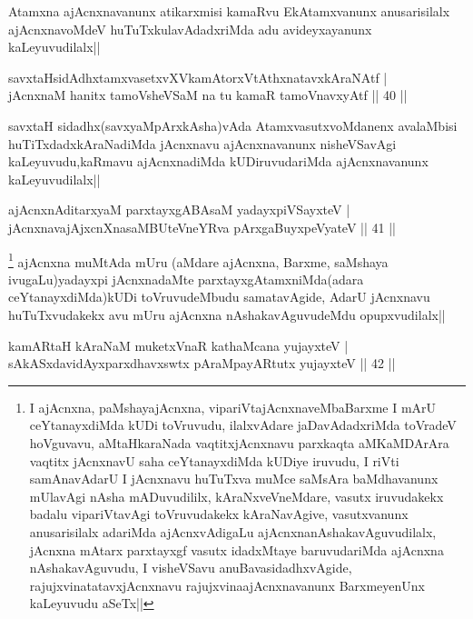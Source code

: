 \begin{artha}
Atamxna ajAcnxnavanunx atikarxmisi kamaRvu EkAtamxvanunx anusarisilalx ajAcnxnavoMdeV huTuTxkulavAdadxriMda adu avideyxayanunx kaLeyuvudilalx||
\end{artha}

\begin{shl}
savxtaHsidAdhxtamxvasetxvXVkamAtorxVtAthxnatavxkAraNAtf |\\
jAcnxnaM hanitx tamoV\s sheVSaM na tu kamaR tamoVnavxyAtf \hfill || 40 ||
\end{shl}

\begin{artha}
savxtaH sidadhx(savxyaMpArxkAsha)vAda AtamxvasutxvoMdanenx avalaMbisi huTiTxdadxkAraNadiMda jAcnxnavu ajAcnxnavanunx nisheVSavAgi kaLeyuvudu,kaRmavu ajAcnxnadiMda kUDiruvudariMda ajAcnxnavanunx kaLeyuvudilalx||
\end{artha}

\begin{shl}
ajAcnxnAditarxyaM parxtayxgABAsaM yadayxpiVSayxteV |\\
jAcnxnavajAjxcnXnasaMBUteVneYRva pArxgaBuyxpeVyateV \hfill || 41 ||
\end{shl}

\begin{artha}
\footnote{I ajAcnxna, paMshayajAcnxna, vipariVtajAcnxnaveMbaBarxme I mArU ceYtanayxdiMda kUDi toVruvudu, ilalxvAdare jaDavAdadxriMda toVradeV hoVguvavu, aMtaHkaraNada vaqtitxjAcnxnavu parxkaqta aMKaMDArAra vaqtitx jAcnxnavU saha ceYtanayxdiMda kUDiye iruvudu, I riVti samAnavAdarU I jAcnxnavu huTuTxva muMce saMsAra baMdhavanunx mUlavAgi nAsha mADuvudililx, kAraNxveVneMdare, vasutx iruvudakekx badalu vipariVtavAgi toVruvudakekx kAraNavAgive, vasutxvanunx anusarisilalx adariMda ajAcnxvAdigaLu ajAcnxnanAshakavAguvudilalx, jAcnxna  mAtarx parxtayxgf vasutx idadxMtaye baruvudariMda ajAcnxna nAshakavAguvudu, I visheVSavu anuBavasidadhxvAgide, rajujxvinatatavxjAcnxnavu rajujxvinaajAcnxnavanunx BarxmeyenUnx kaLeyuvudu aSeTx||} ajAcnxna muMtAda mUru (aMdare ajAcnxna, Barxme, saMshaya ivugaLu)yadayxpi jAcnxnadaMte parxtayxgAtamxniMda(adara ceYtanayxdiMda)kUDi toVruvudeMbudu samatavAgide, AdarU jAcnxnavu huTuTxvudakekx avu mUru ajAcnxna nAshakavAguvudeMdu opupxvudilalx||
\end{artha}

\begin{shl}
kamARtaH kAraNaM muketxVnaR kathaMcana yujayxteV |\\
sAkASxdavidAyxparxdhavxswtx pAraMpayARtutx yujayxteV \hfill || 42 ||
\end{shl}

